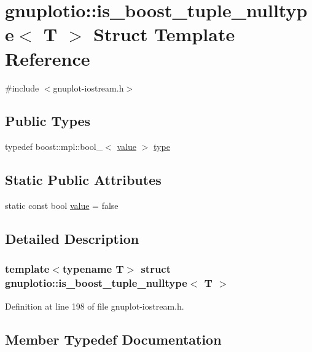\hypertarget{structgnuplotio_1_1is__boost__tuple__nulltype}{}\section{gnuplotio\+:\+:is\+\_\+boost\+\_\+tuple\+\_\+nulltype$<$ T $>$ Struct Template Reference}
\label{structgnuplotio_1_1is__boost__tuple__nulltype}


{\ttfamily \#include $<$gnuplot-\/iostream.\+h$>$}

\subsection*{Public Types}
\begin{DoxyCompactItemize}
\item 
typedef boost\+::mpl\+::bool\+\_\+$<$ \hyperlink{structgnuplotio_1_1is__boost__tuple__nulltype_aed42a98e58eb94c7ba55ea7d2a8f7fd2}{value} $>$ \hyperlink{structgnuplotio_1_1is__boost__tuple__nulltype_a6b9e2eaadcaa5c788131d4e9e4186349}{type}
\end{DoxyCompactItemize}
\subsection*{Static Public Attributes}
\begin{DoxyCompactItemize}
\item 
static const bool \hyperlink{structgnuplotio_1_1is__boost__tuple__nulltype_aed42a98e58eb94c7ba55ea7d2a8f7fd2}{value} = false
\end{DoxyCompactItemize}


\subsection{Detailed Description}
\subsubsection*{template$<$typename T$>$\newline
struct gnuplotio\+::is\+\_\+boost\+\_\+tuple\+\_\+nulltype$<$ T $>$}



Definition at line 198 of file gnuplot-\/iostream.\+h.



\subsection{Member Typedef Documentation}
\mbox{\label{structgnuplotio_1_1is__boost__tuple__nulltype_a6b9e2eaadcaa5c788131d4e9e4186349}} 
